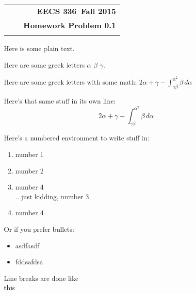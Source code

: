 \documentclass[11pt]{article}
\makeatletter
\newcommand{\course}{EECS 336}
\newcommand{\semester}{Fall 2015}
\newcommand{\hwk}{Homework Problem 0.1}
\renewcommand\maketitle{
\begin{center}
\begin{tabular*}{6.44in}{l @{\extracolsep{\fill}}c r}
\bfseries  &  & \bfseries \course ~\semester \\
\bfseries&  & \bfseries  \hwk  \\
\bfseries   &   &  \bfseries \\ 
\end{tabular*}
\end{center} }
\makeatother
\begin{document}
\maketitle
\thispagestyle{plain}

Here is some plain text.

Here are some greek letters $\alpha$ $\beta$ $\gamma$.

Here are some greek letters with some math: $2\alpha + \gamma - \int_{\gamma\beta}^{\alpha^2}\beta\,d\alpha$

Here's that same stuff in its own line: $$2\alpha + \gamma - \int_{\gamma\beta}^{\alpha^2}\beta\,d\alpha$$

Here's a numbered environment to write stuff in:
\begin{enumerate}
\item number 1
\item number 2
\item number 4\\
...just kidding, number 3
\item number 4
\end{enumerate}

Or if you prefer bullets:
\begin{itemize}
\item asdfasdf
\item fddsafdsa
\end{itemize}

Line breaks are done like \\this
\end{document}
